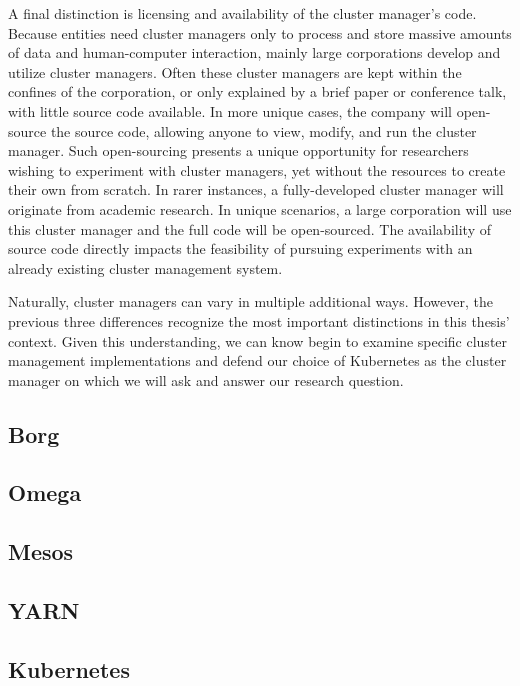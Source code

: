 A final distinction is licensing and availability of the cluster manager's code.
Because entities need cluster managers only to process and store massive amounts
of data and human-computer interaction, mainly large
corporations develop and utilize cluster managers. Often these cluster
managers are kept within the confines of the corporation, or only explained by a
brief paper or conference talk, with little source code available. In more
unique cases, the company will open-source the source code, allowing anyone to
view, modify, and run the cluster manager. Such open-sourcing presents a unique opportunity
for researchers wishing to experiment with cluster managers, yet without the
resources to create their own from scratch. In rarer instances, a
fully-developed cluster manager will originate from academic research. In unique
scenarios, a large corporation will use this cluster manager and the full code will
be open-sourced. The availability of source code directly impacts the
feasibility of pursuing experiments with an already existing cluster management
system.

Naturally, cluster managers can vary in multiple additional ways. However,
the previous three differences recognize the most important distinctions in this
thesis' context. Given this understanding, we can know begin to examine specific
cluster management implementations and defend our choice of Kubernetes as the
cluster manager on which we will ask and answer our research question.

\subsection{Borg}



\subsection{Omega}





\subsection{Mesos}



\subsection{YARN}



\subsection{Kubernetes}


